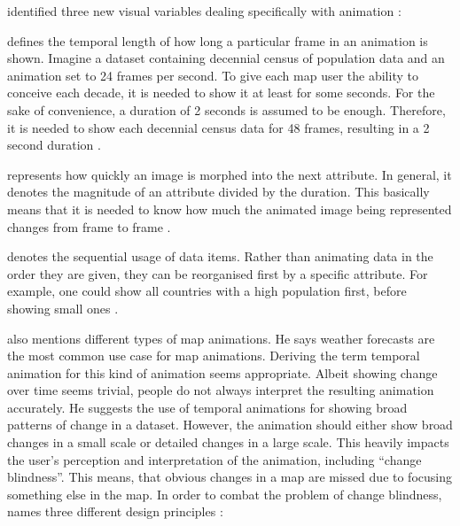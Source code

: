 \citeauthor{DiBiase1992} identified three new visual variables dealing specifically with animation :

\begin{enumerate}

 defines the temporal length of how long a particular frame in an animation is shown. Imagine a dataset containing decennial census of population data and an animation set to 24 frames per second. To give each map user the ability to conceive each decade, it is needed to show it at least for some seconds. For the sake of convenience, a duration of 2 seconds is assumed to be enough. Therefore, it is needed to show each decennial census data for 48 frames, resulting in a 2 second duration .

 represents how quickly an image is morphed into the next attribute. In general, it denotes the magnitude of an attribute divided by the duration. This basically means that it is needed to know how much the animated image being represented changes from frame to frame .

 denotes the sequential usage of data items. Rather than animating data in the order they are given, they can be reorganised first by a specific attribute. For example, one could show all countries with a high population first, before showing small ones .

\end{enumerate}

\citeauthor{Muehlenhaus2014} also mentions different types of map animations. He says weather forecasts are the most common use case for map animations. Deriving the term temporal animation for this kind of animation seems appropriate. Albeit showing change over time seems trivial, people do not always interpret the resulting animation accurately. He suggests the use of temporal animations for showing broad patterns of change in a dataset. However, the animation should either show broad changes in a small scale or detailed changes in a large scale. This heavily impacts the user's perception and interpretation of the animation, including ``change blindness''. This means, that obvious changes in a map are missed due to focusing something else in the map. In order to combat the problem of change blindness, \citeauthor{Muehlenhaus2014} names three different design principles :

